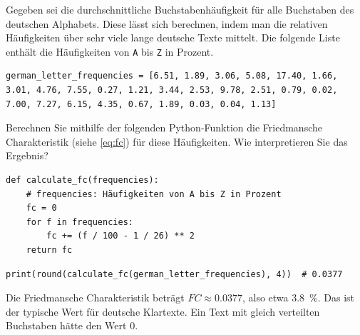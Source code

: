 \begin{myexercise}
    Gegeben sei die durchschnittliche Buchstabenhäufigkeit für alle Buchstaben des deutschen Alphabets. Diese lässt sich berechnen, indem man die relativen Häufigkeiten über sehr viele lange deutsche Texte mittelt. Die folgende Liste enthält die Häufigkeiten von \texttt{A} bis \texttt{Z} in Prozent.

    \begin{lstlisting}[numbers=none]
german_letter_frequencies = [6.51, 1.89, 3.06, 5.08, 17.40, 1.66, 3.01, 4.76, 7.55, 0.27, 1.21, 3.44, 2.53, 9.78, 2.51, 0.79, 0.02, 7.00, 7.27, 6.15, 4.35, 0.67, 1.89, 0.03, 0.04, 1.13]
\end{lstlisting}

    Berechnen Sie mithilfe der folgenden Python-Funktion die Friedmansche Charakteristik (siehe \cref{eq:fc}) für diese Häufigkeiten. Wie interpretieren Sie das Ergebnis?
    \begin{lstlisting}[numbers=none]
def calculate_fc(frequencies):
    # frequencies: Häufigkeiten von A bis Z in Prozent
    fc = 0
    for f in frequencies:
        fc += (f / 100 - 1 / 26) ** 2
    return fc
\end{lstlisting}
    \begin{myanswer}
        \begin{lstlisting}[numbers=none]
print(round(calculate_fc(german_letter_frequencies), 4))  # 0.0377
\end{lstlisting}
        Die Friedmansche Charakteristik beträgt $FC \approx 0.0377$, also etwa \qty{3.8}{\percent}. Das ist der typische Wert für deutsche Klartexte. Ein Text mit gleich verteilten Buchstaben hätte den Wert $0$.
    \end{myanswer}
\end{myexercise}


